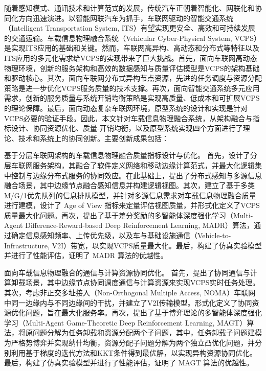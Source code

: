 \begin{cabstract}	%

随着感知模式、通讯技术和计算范式的发展，传统汽车正朝着智能化、网联化和协同化方向迅速演进。以智能网联汽车为抓手，车联网驱动的智能交通系统（Intelligent Transportation System, ITS）有望实现更安全、高效和可持续发展的交通运输。车载信息物理融合系统（Vehicular Cyber-Physical System, VCPS）是实现ITS应用的基础和关键。然而，车联网高异构、高动态和分布式等特征以及ITS应用的多元化需求给VCPS的实现带来了巨大挑战。首先，面向车联网高动态物理环境，创新的服务架构和高效的数据感知与质量评估模型是VCPS的架构基础和驱动核心。其次，面向车联网分布式异构节点资源，先进的任务调度与资源分配策略是进一步优化VCPS服务质量的技术支撑。再次，面向智能交通系统多元应用需求，创新的服务质量与系统开销均衡策略是实现高质量、低成本和可扩展VCPS的理论保障。最后，面向动态复杂车联网环境，原型系统的设计和实现是针对VCPS必要的验证手段。因此，本文针对车载信息物理融合系统，从架构融合与指标设计、协同资源优化、质量-开销均衡，以及原型系统实现四个方面进行了理论、技术和系统上的协同创新。主要创新成果包括：

 基于分层车联网架构的车载信息物理融合质量指标设计与优化。
首先，设计了分层车联网服务架构，其融合了软件定义网络和移动边缘计算范式，并最大化逻辑集中控制与边缘分布式服务的协同效应。在此基础上，提出了分布式感知与多源信息融合场景，其中边缘节点融合感知信息并构建逻辑视图。其次，建立了基于多类M/G/1优先队列的信息排队模型，并针对多源信息需求对车载信息物理融合质量进行建模，设计了 Age of View 指标来定量评估视图质量，并形式化定义了VCPS质量最大化问题。再次，提出了基于差分奖励的多智能体深度强化学习（Multi-Agent Difference-Reward-based Deep Reinforcement Learning, MADR）算法，通过确定信息感知频率、上传优先级，以及车与基础设施通信（Vehicle-to-Infrastructure, V2I）带宽，以实现VCPS质量最大化。最后，构建了仿真实验模型并进行了性能评估，证明了 MADR 算法的优越性。

 面向车载信息物理融合的通信与计算资源协同优化。
首先，提出了协同通信与计算卸载场景，其中边缘节点协同调度通信与计算资源来实现VCPS实时任务处理。其次，考虑非正交多址接入（Non-Orthogonal Multiple Access, NOMA）车联网中同一边缘内与不同边缘间的干扰，并建立了V2I传输模型。形式化定义了协同资源优化问题，旨在最大化服务率。再次，提出了基于博弈理论的多智能体深度强化学习（Multi-Agent Game-Theoretic Deep Reinforcement Learning, MAGT）算法，将原问题分解为任务卸载和资源分配两个子问题，其中，任务卸载子问题建模为严格势博弈并实现纳什均衡，资源分配子问题分解为两个独立凸优化问题，并分别利用基于梯度的迭代方法和KKT条件得到最优解，以实现异构资源协同优化。最后，构建了仿真实验模型并进行了性能评估，证明了 MAGT 算法的优越性。


\end{cabstract}
